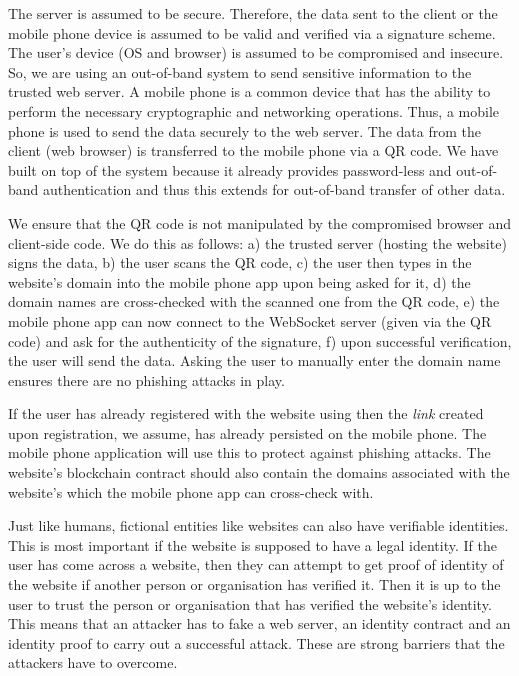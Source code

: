 



The server is assumed to be secure. Therefore, the data sent to the client or the mobile phone device is assumed to be valid and verified via a signature scheme. The user's device (OS and browser) is assumed to be compromised and insecure. So, we are using an out-of-band system to send sensitive information to the trusted web server. A mobile phone is a common device that has the ability to perform the necessary cryptographic and networking operations. Thus, a mobile phone is used to send the data securely to the web server. The data from the client (web browser) is transferred to the mobile phone via a QR code. We have built on top of the \deeid system because it already provides password-less and out-of-band authentication and thus this extends \deeid for out-of-band transfer of other data.

We ensure that the QR code is not manipulated by the compromised browser and client-side code. We do this as follows: a) the trusted server (hosting the website) signs the data, b) the user scans the QR code, c) the user then types in the website's domain into the mobile phone app upon being asked for it, d) the domain names are cross-checked with the scanned one from the QR code, e) the mobile phone app can now connect to the WebSocket server (given via the QR code) and ask for the authenticity of the signature, f) upon successful verification, the user will send the data.
Asking the user to manually enter the domain name ensures there are no phishing attacks in play.

If the user has already registered with the website using \deeid then the \textit{link} created upon registration, we assume, has already persisted on the mobile phone. The mobile phone application will use this to protect against phishing attacks. The website's \deeid blockchain contract should also contain the domains associated with the website's \deeid which the mobile phone app can cross-check with.

Just like humans, fictional entities like websites can also have verifiable identities. This is most important if the website is supposed to have a legal identity. If the user has come across a website, then they can attempt to get proof of identity of the website if another person or organisation has verified it. Then it is up to the user to trust the person or organisation that has verified the website's identity. This means that an attacker has to fake a web server, an identity contract and an identity proof to carry out a successful attack. These are strong barriers that the attackers have to overcome.


